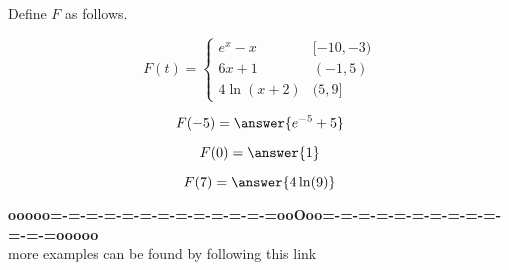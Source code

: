 \documentclass{ximera}
\begin{document}
\begin{example}

Define $F$ as follows.


\[
F(t) = 
\begin{cases}
  e^x - x   &    [-10, -3)     \\
  6x + 1  &    (-1, 5) \\
  4 \ln(x+2)    &    (5, 9]
\end{cases}
\]




\begin{question}

\[
F(-5) = \answer{e^{-5} + 5}
\]


\end{question}




\begin{question}

\[
F(0) = \answer{1}
\]


\end{question}






\begin{question}

\[
F(7) = \answer{4 \ln(9)}
\]


\end{question}




\end{example}


















\begin{center}
\textbf{\textcolor{green!50!black}{ooooo=-=-=-=-=-=-=-=-=-=-=-=-=ooOoo=-=-=-=-=-=-=-=-=-=-=-=-=ooooo}} \\

more examples can be found by following this link\\ 

\end{center}
\end{document}
